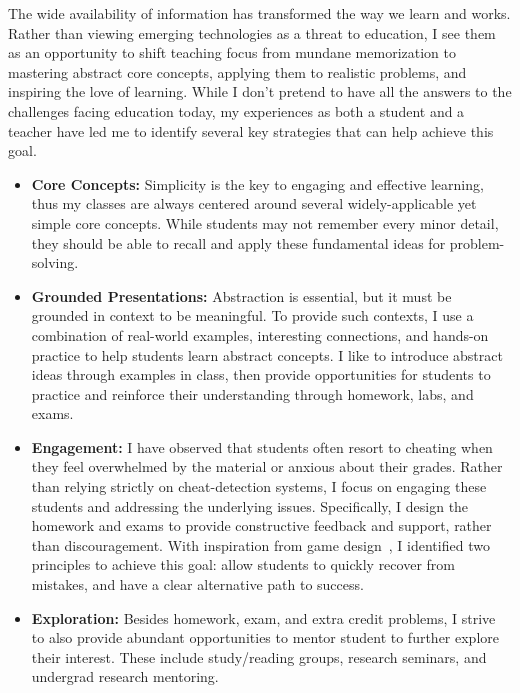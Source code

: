 \documentclass[11pt,a4paper,sans]{moderncv} %
\begin{document}
The wide availability of information has transformed the way we learn and works. 
Rather than viewing emerging technologies as a threat to education, I see them as an opportunity to shift teaching focus from mundane memorization to mastering abstract core concepts, applying them to realistic problems, and inspiring the love of learning.
While I don't pretend to have all the answers to the challenges facing education today, my experiences as both a student and a teacher have led me to identify several key strategies that can help achieve this goal.
\begin{itemize}
  \item \textbf{Core Concepts:}
  Simplicity is the key to engaging and effective learning, thus my classes are always centered around several widely-applicable yet simple core concepts. 
  While students may not remember every minor detail, they should be able to recall and apply these fundamental ideas for problem-solving.
  \item \textbf{Grounded Presentations:} 
  Abstraction is essential, but it must be grounded in context to be meaningful. 
  To provide such contexts, I use a combination of real-world examples, interesting connections, and hands-on practice to help students learn abstract concepts. 
  I like to introduce abstract ideas through examples in class, then provide opportunities for students to practice and reinforce their understanding through homework, labs, and exams.
  \item \textbf{Engagement:}
  I have observed that students often resort to cheating when they feel overwhelmed by the material or anxious about their grades. 
  Rather than relying strictly on cheat-detection systems, I focus on engaging these students and addressing the underlying issues. 
  Specifically, I design the homework and exams to provide constructive feedback and support, rather than discouragement. 
  With inspiration from game design~\cite{engelstein_AchievementRelockedLoss_2020,lewis_MotivationalGameDesign_2012}, I identified two principles to achieve this goal: allow students to quickly recover from mistakes, and have a clear alternative path to success.
  \item \textbf{Exploration:} Besides homework, exam, and extra credit problems, I strive to also provide abundant opportunities to mentor student to further explore their interest. 
  These include study/reading groups, research seminars, and undergrad research mentoring.
\end{itemize}
\end{document}
